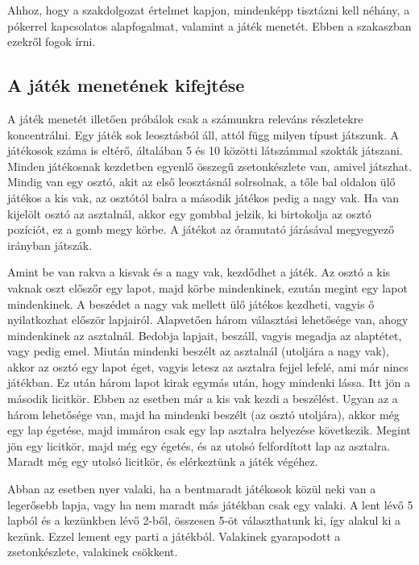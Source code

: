 
Ahhoz, hogy a szakdolgozat értelmet kapjon, mindenképp tisztázni kell néhány, a pókerrel kapcsolatos alapfogalmat, valamint a játék menetét. Ebben a szakaszban ezekről fogok írni.

\subsection{A játék menetének kifejtése}
A játék menetét illetően próbálok csak a számunkra releváns részletekre koncentrálni. Egy játék sok leosztásból áll, attól függ milyen típust játszunk. A játékosok száma is eltérő, általában 5 és 10 közötti látszámmal szokták játszani. Minden játékosnak kezdetben egyenlő összegű zsetonkészlete van, amivel játszhat. Mindig van egy osztó, akit az első leosztásnál solrsolnak, a tőle bal oldalon ülő játékos a kis vak, az osztótól balra a második játékos pedig a nagy vak. Ha van kijelölt osztó az asztalnál, akkor egy gombbal jelzik, ki birtokolja az osztó pozíciót, ez a gomb megy körbe. A játékot az óramutató járásával megyegyező irányban játszák.

Amint be van rakva a kisvak és a nagy vak, kezdődhet a játék. Az osztó a kis vaknak oszt előszőr egy lapot, majd körbe mindenkinek, ezután megint egy lapot mindenkinek. A beszédet a nagy vak mellett ülő játékos kezdheti, vagyis ő nyilatkozhat először lapjairól. Alapvetően három választási lehetősége van, ahogy mindenkinek az asztalnál. Bedobja lapjait, beszáll, vagyis megadja az alaptétet, vagy pedig emel. Miután mindenki beszélt az asztalnál (utoljára a nagy vak), akkor az osztó egy lapot éget, vagyis letesz az asztalra fejjel lefelé, ami már nincs játékban. Ez után három lapot kirak egymás után, hogy mindenki lássa. Itt jön a második licitkör. Ebben az esetben már a kis vak kezdi a beszélést. Ugyan az a három lehetősége van, majd ha mindenki beszélt (az osztó utoljára), akkor még egy lap égetése, majd immáron csak egy lap asztalra helyezése következik. Megint jön egy licitkör, majd még egy égetés, és az utolsó felfordított lap az asztalra. Maradt még egy utolsó licitkör, és elérkeztünk a játék végéhez.

Abban az esetben nyer valaki, ha a bentmaradt játékosok közül neki van a legerősebb lapja, vagy ha nem maradt más játékban csak egy valaki. A lent lévő 5 lapból és a kezünkben lévő 2-ből, összesen 5-öt választhatunk ki, így alakul ki a kezünk. Ezzel lement egy parti a játékból. Valakinek gyarapodott a zsetonkészlete, valakinek csökkent.

